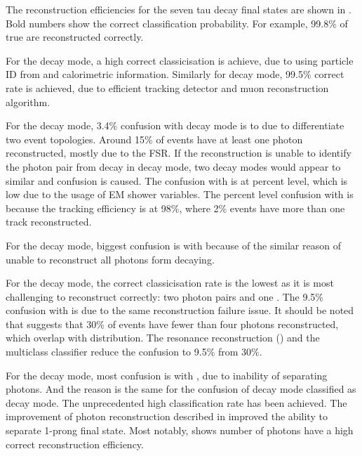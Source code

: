 The reconstruction efficiencies for the seven tau decay final states are shown in . Bold numbers show the correct classification probability. For example, 99.8\%  of true \decayElectronShort are reconstructed correctly.

For the \decayElectronShort decay mode, a high correct classicisation is achieve, due to using particle ID from \pandora and calorimetric information. Similarly for \decayMuonShort decay mode,  99.5\% correct rate is achieved, due to efficient tracking detector and muon reconstruction algorithm.

For the \decayPionShort decay mode, 3.4\% confusion with \decayRhoShortest decay mode  is to due to differentiate two event topologies. Around 15\% of \decayPionShort events have at least one photon reconstructed, mostly due to the FSR. If the reconstruction is unable to identify the photon pair from \Ppizero decay in \decayRhoShortest decay mode, two decay modes would appear to  similar and confusion is caused. The confusion with \decayElectronShort is at percent level, which is low due to the usage of EM shower variables. The percent level confusion with \decayAiPionShortest is because the tracking efficiency is at 98\%, where 2\% \decayPionShort events have more than one track reconstructed.

For the \decayRhoShortest decay mode, biggest confusion is with \decayAiPhotonShortest because of the similar reason of unable to reconstruct all photons form \Ppizero decaying.

For the \decayAiPhotonShortest decay mode, the correct classicisation rate is the lowest as it is most challenging to reconstruct correctly: two photon pairs and  one \Ppipm. The 9.5\% confusion with \decayRhoShortest is due to the same reconstruction failure issue. It should be noted that  suggests that 30\% of \decayAiPhotonShortest events have fewer than four photons reconstructed, which overlap with \decayRhoShortest distribution. The \decayAiPhotonShortest resonance reconstruction () and the multiclass classifier reduce the confusion to  9.5\% from 30\%.

For the \decayAiPionShortest decay mode, most confusion is with \decayThreePionPhotonShort, due to inability of separating photons. And the reason is the same for the confusion of  \decayThreePionPhotonShort decay mode classified as \decayAiPionShortest decay mode.
The unprecedented high classification rate has been achieved. The improvement of photon reconstruction described in \Section{} improved the ability to separate 1-prong final state. Most notably,  \Figure{} shows number of photons have a high correct reconstruction efficiency.


